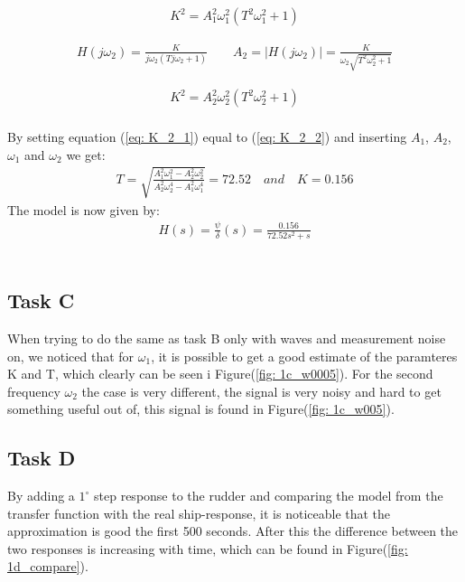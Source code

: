 \begin{equation}
    \begin{align}
        K^2 = A_1^2\omega_1^2(T^2\omega_1^2 + 1) \label{eq: K_2_1}
    \end{align}
\end{equation}

\begin{equations}
    \begin{align}
        H(j\omega_2) = \frac{K}{j\omega_2(Tj\omega_2 + 1)} \qquad A_2 = |H(j\omega_2)| = \frac{K}{\omega_2\sqrt{T^2\omega_2^2 + 1}} \nonumber
    \end{align}
\end{equations}
\begin{equation}
    \begin{align}
        K^2 = A_2^2\omega_2^2(T^2\omega_2^2 + 1) \label{eq: K_2_2}
    \end{align}
\end{equation}
\\
By setting equation (\ref{eq: K_2_1}) equal to (\ref{eq: K_2_2}) and inserting $A_1$, $A_2$, $\omega_1$ and $\omega_2$ we get:
\begin{equation}
    \begin{align}
        T = \sqrt{\frac{A_1^2\omega_1^2 - A_2^2\omega_2^2}{A_2^2\omega_2^4 - A_1^2\omega_1^4}} = 72.52 \quad and \quad K = 0.156
    \end{align}
\end{equation}
\newpage
The model is now given by:
\begin{equation}
    \begin{align}
        H(s) = \frac{\psi}{\delta}(s) = \frac{0.156}{72.52s^2+s}
    \end{align}
\end{equation}
\\

\subsection{Task C}
When trying to do the same as task B only with waves and measurement noise on, we noticed that for $\omega_1$, it is possible to get a good estimate of the paramteres K and T, which clearly can be seen i Figure(\ref{fig: 1c_w0005}). For the second frequency $\omega_2$ the case is very different, the signal is very noisy and hard to get something useful out of, this signal is found in Figure(\ref{fig: 1c_w005}).
\\

\subsection{Task D}
By adding a $1^{\circ}$ step response to the rudder and comparing the model from the transfer function with the real ship-response, it is noticeable that the approximation is good the first 500 seconds. After this the difference between the two responses is increasing with time, which can be found in Figure(\ref{fig: 1d_compare}).
\newpage


